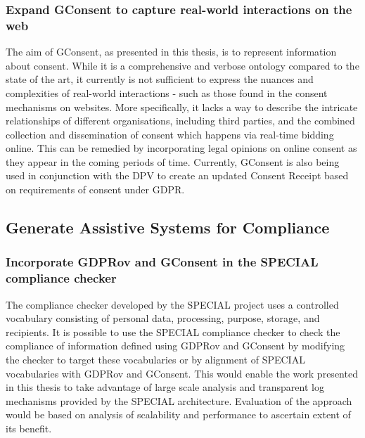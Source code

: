 \subsubsection*{Expand GConsent to capture real-world interactions on the web}
The aim of GConsent, as presented in this thesis, is to represent information about consent. While it is a comprehensive and verbose ontology compared to the state of the art, it currently is not sufficient to express the nuances and complexities of real-world interactions - such as those found in the consent mechanisms on websites. More specifically, it lacks a way to describe the intricate relationships of different organisations, including third parties, and the combined collection and dissemination of consent which happens via real-time bidding online. This can be remedied by incorporating legal opinions on online consent as they appear in the coming periods of time.
Currently, GConsent is also being used in conjunction with the DPV to create an updated Consent Receipt \cite{lizar_consent_2017} based on requirements of consent under GDPR.

\subsection*{Generate Assistive Systems for Compliance}
\subsubsection*{Incorporate GDPRov and GConsent in the SPECIAL compliance checker}
The compliance checker developed by the SPECIAL project \cite{kirrane_scalable_2018} uses a controlled vocabulary consisting of personal data, processing, purpose, storage, and recipients. It is possible to use the SPECIAL compliance checker to check the compliance of information defined using GDPRov and GConsent by modifying the checker to target these vocabularies or by alignment of SPECIAL vocabularies with GDPRov and GConsent. This would enable the work presented in this thesis to take advantage of large scale analysis and transparent log mechanisms provided by the SPECIAL architecture. Evaluation of the approach would be based on analysis of scalability and performance to ascertain extent of its benefit.

